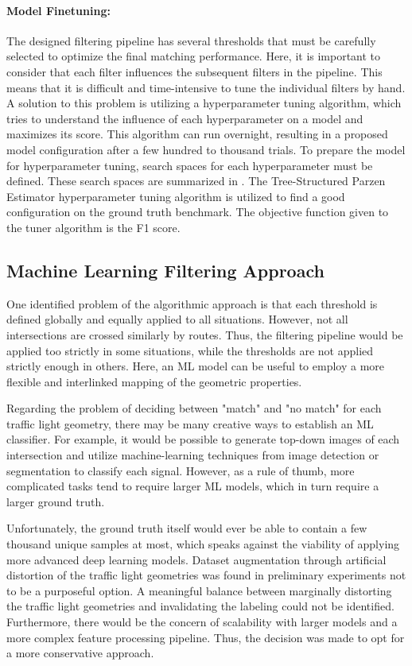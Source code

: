 \paragraph{Model Finetuning:} The designed filtering pipeline has several thresholds that must be carefully selected to optimize the final matching performance. Here, it is important to consider that each filter influences the subsequent filters in the pipeline. This means that it is difficult and time-intensive to tune the individual filters by hand. A solution to this problem is utilizing a hyperparameter tuning algorithm, which tries to understand the influence of each hyperparameter on a model and maximizes its score. This algorithm can run overnight, resulting in a proposed model configuration after a few hundred to thousand trials. To prepare the model for hyperparameter tuning, search spaces for each hyperparameter must be defined. These search spaces are summarized in . The Tree-Structured Parzen Estimator hyperparameter tuning algorithm \cite{ozaki_multiobjective_2020} is utilized to find a good configuration on the ground truth benchmark. The objective function given to the tuner algorithm is the F1 score.

\subsection{Machine Learning Filtering Approach}

One identified problem of the algorithmic approach is that each threshold is defined globally and equally applied to all situations. However, not all intersections are crossed similarly by routes. Thus, the filtering pipeline would be applied too strictly in some situations, while the thresholds are not applied strictly enough in others. Here, an ML model can be useful to employ a more flexible and interlinked mapping of the geometric properties.

Regarding the problem of deciding between "match" and "no match" for each traffic light geometry, there may be many creative ways to establish an ML classifier. For example, it would be possible to generate top-down images of each intersection and utilize machine-learning techniques from image detection or segmentation to classify each signal. However, as a rule of thumb, more complicated tasks tend to require larger ML models, which in turn require a larger ground truth. 

Unfortunately, the ground truth itself would ever be able to contain a few thousand unique samples at most, which speaks against the viability of applying more advanced deep learning models. Dataset augmentation through artificial distortion of the traffic light geometries was found in preliminary experiments not to be a purposeful option. A meaningful balance between marginally distorting the traffic light geometries and invalidating the labeling could not be identified. Furthermore, there would be the concern of scalability with larger models and a more complex feature processing pipeline. Thus, the decision was made to opt for a more conservative approach.

